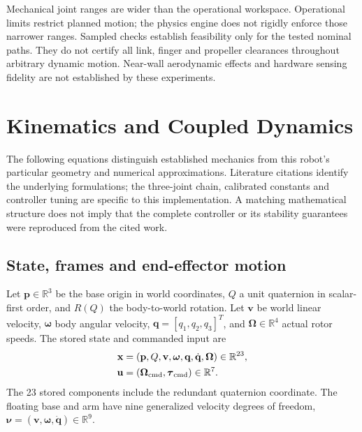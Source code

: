 \documentclass[conference]{IEEEtran}
\newcommand{\R}{\mathbb{R}}
\begin{document}
Mechanical joint ranges are wider than the operational workspace. Operational limits restrict planned motion; the physics engine does not rigidly enforce those narrower ranges. Sampled checks establish feasibility only for the tested nominal paths. They do not certify all link, finger and propeller clearances throughout arbitrary dynamic motion. Near-wall aerodynamic effects and hardware sensing fidelity are not established by these experiments.

\section{Kinematics and Coupled Dynamics}
The following equations distinguish established mechanics from this robot's particular geometry and numerical approximations. Literature citations identify the underlying formulations; the three-joint chain, calibrated constants and controller tuning are specific to this implementation. A matching mathematical structure does not imply that the complete controller or its stability guarantees were reproduced from the cited work.
\subsection{State, frames and end-effector motion}
Let $\mathbf p\in\R^3$ be the base origin in world coordinates, $Q$ a unit quaternion in scalar-first order, and $R(Q)$ the body-to-world rotation. Let $\mathbf v$ be world linear velocity, $\boldsymbol\omega$ body angular velocity, $\mathbf q=[q_1,q_2,q_3]^T$, and $\boldsymbol\Omega\in\R^4$ actual rotor speeds. The stored state and commanded input are
\begin{align}
\mathbf x&=(\mathbf p,Q,\mathbf v,\boldsymbol\omega,\mathbf q,\dot{\mathbf q},\boldsymbol\Omega)\in\R^{23},\label{eq:state}\\
\mathbf u&=(\boldsymbol\Omega_{\rm cmd},\boldsymbol\tau_{\rm cmd})\in\R^7.
\end{align}
The 23 stored components include the redundant quaternion coordinate. The floating base and arm have nine generalized velocity degrees of freedom,
$\boldsymbol\nu=(\mathbf v,\boldsymbol\omega,\dot{\mathbf q})\in\R^9$.
\end{document}
